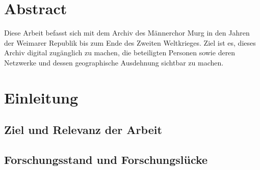 \documentclass[12pt, a4paper, ngerman, bidi=default]{article}
\renewcommand*\contentsname{Inhaltsverzeichnis}
\newcommand\contentsname{Inhaltsverzeichnis}
\begin{document}
\pagecolor{white}  
\color{black}  %
\section*{Abstract}

Diese Arbeit befasst sich mit dem Archiv des Männerchor Murg in den Jahren der Weimarer Republik bis zum Ende des Zweiten Weltkrieges. Ziel ist es, dieses Archiv digital zugänglich zu machen, die beteiligten Personen sowie deren Netzwerke und dessen geographische Ausdehnung sichtbar zu machen.

\newpage




\renewcommand*\contentsname{Inhaltsverzeichnis} %
{
\hypersetup{linkcolor=}
\setcounter{tocdepth}{5} %
\tableofcontents
}
\newpage
{} %



\section{Einleitung}
\subsection{Ziel und Relevanz der Arbeit}
\subsection{Forschungsstand und Forschungslücke}
\end{document}
